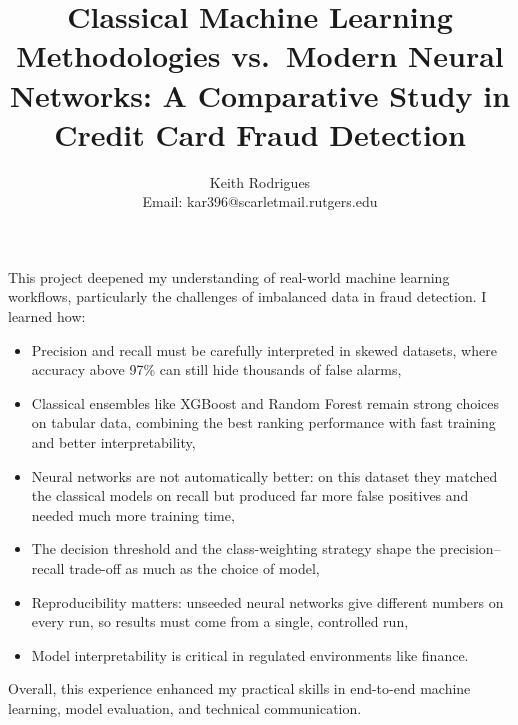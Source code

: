 \documentclass[journal]{IEEEtran}
\begin{document}
\noindent This project deepened my understanding of real-world machine learning workflows, particularly the challenges of imbalanced data in fraud detection. I learned how:
\begin{itemize}
  \item Precision and recall must be carefully interpreted in skewed datasets, where accuracy above 97\% can still hide thousands of false alarms,
  \item Classical ensembles like XGBoost and Random Forest remain strong choices on tabular data, combining the best ranking performance with fast training and better interpretability,
  \item Neural networks are not automatically better: on this dataset they matched the classical models on recall but produced far more false positives and needed much more training time,
  \item The decision threshold and the class-weighting strategy shape the precision--recall trade-off as much as the choice of model,
  \item Reproducibility matters: unseeded neural networks give different numbers on every run, so results must come from a single, controlled run,
  \item Model interpretability is critical in regulated environments like finance.
\end{itemize}
\noindent Overall, this experience enhanced my practical skills in end-to-end machine learning, model evaluation, and technical communication.

\twocolumn
\title{Classical Machine Learning Methodologies vs.\ Modern Neural Networks: A Comparative Study in Credit Card Fraud Detection}
\author{Keith Rodrigues\\ Email: kar396@scarletmail.rutgers.edu}
\maketitle
\end{document}
